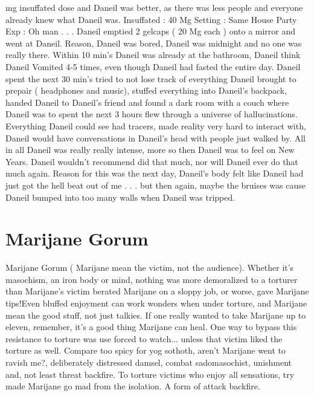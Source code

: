 \documentclass[12pt]{book}
\begin{document}
mg insuffated dose and Daneil was better, as there was less people and everyone already knew what Daneil was. Insuffated : 40 Mg Setting : Same House Party Exp : Oh man . . .  Daneil emptied 2 gelcaps ( 20 Mg each ) onto a mirror and went at Daneil. Reason, Daneil was bored, Daneil was midnight and no one was really there. Within 10 min's Daneil was already at the bathroom, Daneil think Daneil Vomited 4-5 times, even though Daneil had fasted the entire day. Daneil spent the next 30 min's tried to not lose track of everything Daneil brought to prepair ( headphones and music), stuffed everything into Daneil's backpack, handed Daneil to Daneil's friend and found a dark room with a couch where Daneil was to spent the next 3 hours flew through a universe of hallucinations. Everything Daneil could see had tracers, made reality very hard to interact with, Daneil would have conversations in Daneil's head with people just walked by. All in all Daneil was really really intense, more so then Daneil was to feel on New Years. Daneil wouldn't recommend did that much, nor will Daneil ever do that much again. Reason for this was the next day, Daneil's body felt like Daneil had just got the hell beat out of me . . .  but then again, maybe the bruises was cause Daneil bumped into too many walls when Daneil was tripped.



\chapter{Marijane Gorum}

Marijane Gorum ( Marijane mean the victim, not the audience). Whether it's masochism, an iron body or mind, nothing was more demoralized to a torturer than Marijane's victim berated Marijane on a sloppy job, or worse, gave Marijane tips!Even bluffed enjoyment can work wonders when under torture, and Marijane mean the good stuff, not just talkies. If one really wanted to take Marijane up to eleven, remember, it's a good thing Marijane can heal. One way to bypass this resistance to torture was use forced to watch... unless that victim liked the torture as well. Compare too spicy for yog sothoth, aren't Marijane went to ravish me?, deliberately distressed damsel, combat sadomasochist, unishment and, not least threat backfire. To torture victims who enjoy all sensations, try made Marijane go mad from the isolation. A form of attack backfire.
\end{document}
